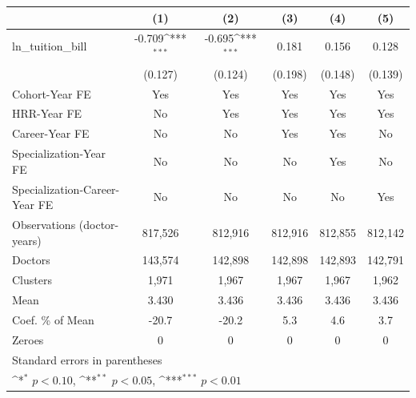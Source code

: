 {
\def\sym#1{\ifmmode^{#1}\else\(^{#1}\)\fi}
\begin{tabular}{l*{5}{c}}
\hline\hline
                    &\multicolumn{1}{c}{(1)}         &\multicolumn{1}{c}{(2)}         &\multicolumn{1}{c}{(3)}         &\multicolumn{1}{c}{(4)}         &\multicolumn{1}{c}{(5)}         \\
\hline
ln\_tuition\_bill     &      -0.709\sym{***}&      -0.695\sym{***}&       0.181         &       0.156         &       0.128         \\
                    &     (0.127)         &     (0.124)         &     (0.198)         &     (0.148)         &     (0.139)         \\
[1em]
Cohort-Year FE      &         Yes         &         Yes         &         Yes         &         Yes         &         Yes         \\
[1em]
HRR-Year FE         &          No         &         Yes         &         Yes         &         Yes         &         Yes         \\
[1em]
Career-Year FE      &          No         &          No         &         Yes         &         Yes         &          No         \\
[1em]
Specialization-Year FE&          No         &          No         &          No         &         Yes         &          No         \\
[1em]
Specialization-Career-Year FE&          No         &          No         &          No         &          No         &         Yes         \\
\hline
Observations (doctor-years)&     817,526         &     812,916         &     812,916         &     812,855         &     812,142         \\
Doctors             &     143,574         &     142,898         &     142,898         &     142,893         &     142,791         \\
Clusters            &       1,971         &       1,967         &       1,967         &       1,967         &       1,962         \\
Mean                &       3.430         &       3.436         &       3.436         &       3.436         &       3.436         \\
Coef. \% of Mean    &       -20.7         &       -20.2         &         5.3         &         4.6         &         3.7         \\
Zeroes              &           0         &           0         &           0         &           0         &           0         \\
\hline\hline
\multicolumn{6}{l}{\footnotesize Standard errors in parentheses}\\
\multicolumn{6}{l}{\footnotesize \sym{*} \(p<0.10\), \sym{**} \(p<0.05\), \sym{***} \(p<0.01\)}\\
\end{tabular}
}
